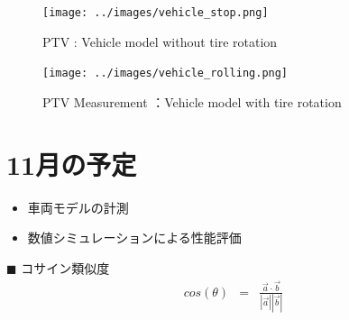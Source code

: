 \documentclass[twocolumn,a4j]{jsarticle}
\begin{document}
\begin{figure}[htbp]
	\centering
	\texttt{[image: ../images/vehicle\_stop.png]}
	\caption{PTV : Vehicle model without tire rotation}
	\baselineskip 4mm
	\texttt{[image: ../images/vehicle\_rolling.png]}
	\caption{PTV Measurement ：Vehicle model with tire rotation}
\end{figure}

\section{11月の予定}
\begin{itemize}
	\item 車両モデルの計測
	\item 数値シミュレーションによる性能評価
\end{itemize}

\newpage
$\blacksquare$ コサイン類似度
\begin{eqnarray*}
	cos(\theta) &=& \frac{\vec{a} \cdot \vec{b}}{|\vec{a}| |\vec{b}|} \\
\end{eqnarray*}
\end{document}
